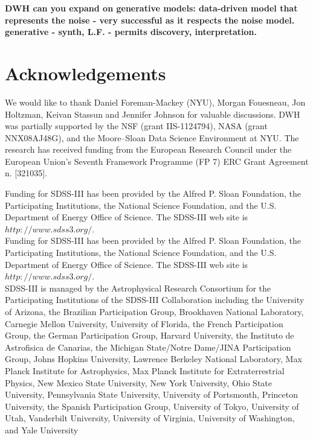 \documentclass[12pt, preprint]{aastex}
\begin{document}
\textbf{DWH can you expand on generative models: data-driven model that represents the noise -  very successful as it respects the noise model. generative - synth, L.F. - permits discovery, interpretation.}


\section*{ Acknowledgements}

We would like to thank Daniel Foreman-Mackey (NYU), 
Morgan Fouesneau, Jon Holtzman,  Keivan Stassun and Jennifer Johnson
for valuable discussions.
DWH was partially supported by
the NSF (grant IIS-1124794), NASA (grant NNX08AJ48G), and the
Moore--Sloan Data Science Environment at NYU.
The research has received funding from the European Research Council under the European
Union's Seventh Framework Programme (FP 7) ERC Grant Agreement n.
[321035].

Funding for SDSS-III has been provided by the Alfred P. Sloan Foundation, the Participating Institutions, 
the National Science Foundation, and the U.S. Department of Energy Office of Science. The SDSS-III web site is $http://www.sdss3.org/.$\\

Funding for SDSS-III has been provided by the Alfred P. Sloan Foundation, the Participating Institutions, the National Science Foundation, and the U.S. Department of Energy Office of Science. The SDSS-III web site is $http://www.sdss3.org/.$\\

SDSS-III is managed by the Astrophysical Research Consortium for the Participating Institutions of the SDSS-III Collaboration
 including the University of Arizona, the Brazilian Participation Group, Brookhaven National Laboratory, Carnegie Mellon University, 
 University of Florida, the French Participation Group, the German Participation Group, Harvard University, the Instituto de Astrofisica 
 de Canarias, the Michigan State/Notre Dame/JINA Participation Group, Johns Hopkins University, Lawrence Berkeley National Laboratory, 
 Max Planck Institute for Astrophysics, Max Planck Institute for Extraterrestrial Physics, New Mexico State University, New York University, 
 Ohio State University, Pennsylvania State University, University of Portsmouth, Princeton University, the Spanish Participation Group, 
 University of Tokyo, University of Utah, Vanderbilt University, University of Virginia, University of Washington, and Yale University



\end{document}
